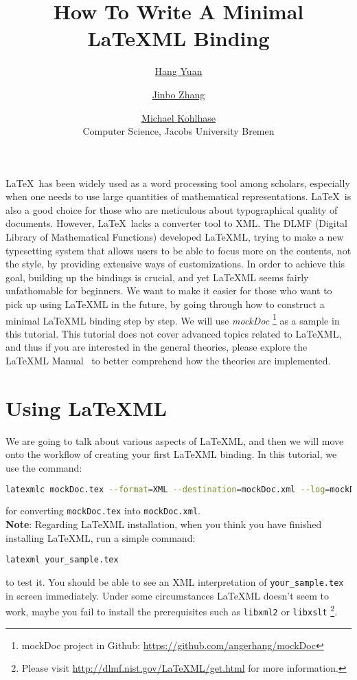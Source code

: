 \documentclass[a4paper]{article}
\title{\textbf{How To Write A Minimal \LaTeX ML Binding}}
\author{\href{mailto:h.yuan@jacobs-university.de}{Hang Yuan} \and 
	\href{mailto:jin.zhang@jacobs-university.de}{Jinbo Zhang} \and
        \href{mailto:m.kohlhase@jacobs-university.de}{Michael Kohlhase}\\
Computer Science, Jacobs University Bremen}
\date{}
\begin{document}
\maketitle

\LaTeX\ has been widely used as a word processing tool among scholars, especially when one
needs to use large quantities of mathematical representations. \LaTeX\ is also a good
choice for those who are meticulous about typographical quality of documents. However,
\LaTeX\ lacks a converter tool to XML. The DLMF (Digital Library of Mathematical
Functions) developed \LaTeX ML, trying to make a new typesetting system that allows users
to be able to focus more on the contents, not the style, by providing extensive ways of
customizations. In order to achieve this goal, building up the bindings is crucial, and
yet \LaTeX ML seems fairly unfathomable for beginners. We want to make it easier for those
who want to pick up using \LaTeX ML in the future, by going through how to construct a
minimal \LaTeX ML binding step by step. We will use \textit{mockDoc} \footnote{mockDoc
  project in Github: \url{https://github.com/angerhang/mockDoc}} as a sample in this
tutorial. This tutorial does not cover advanced topics related to \LaTeX ML, and thus if
you are interested in the general theories, please explore the \LaTeX ML
Manual~\cite{manual} to better comprehend how the theories are implemented.

\section{Using LaTeXML}
We are going to talk about various aspects of \LaTeX ML, and then we will move onto the workflow of creating your first \LaTeX ML binding. In this tutorial, we use the command:
\begin{lstlisting}[language=bash]
latexmlc mockDoc.tex --format=XML --destination=mockDoc.xml --log=mockDoc.xml.log
\end{lstlisting}
for converting \texttt{mockDoc.tex} into \texttt{mockDoc.xml}. \\

 \textbf{Note}: Regarding \LaTeX ML installation, when you think you have finished installing \LaTeX ML, run a simple command:
\begin{lstlisting}
latexml your_sample.tex
\end{lstlisting}
to test it. You should be able to see an XML interpretation of \texttt{your\_sample.tex} in screen immediately. Under some circumstances \LaTeX ML doesn't seem to work, maybe you fail to install the prerequisites such as \texttt{libxml2} or \texttt{libxslt} \footnote{Please visit \url{http://dlmf.nist.gov/LaTeXML/get.html} for more information.}. \\
\end{document}
